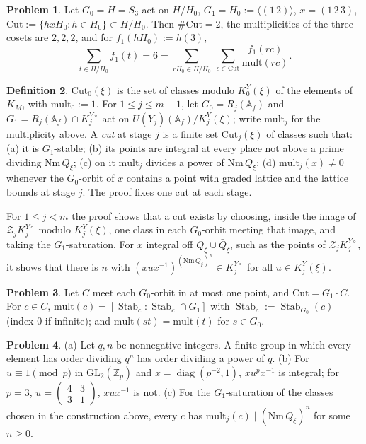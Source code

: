 \documentclass[reqno]{amsart}
\theoremstyle{definition}
\newtheorem{problem}{Problem}[section]
\newtheorem{definition}[problem]{Definition}
\theoremstyle{plain}
\theoremstyle{remark}
\newcommand{\Z}{\mathbb{Z}}
\newcommand{\Af}{\mathbb{A}_f}
\newcommand{\Cut}{\mathrm{Cut}}
\newcommand{\mult}{\mathrm{mult}}
\newcommand{\Nm}{\mathrm{Nm}\,}
\newcommand{\Stab}{\operatorname{Stab}}
\newcommand{\diag}{\operatorname{diag}}
\newcommand{\KYo}[1]{K^{Y\circ}_{#1}}
\newcommand{\KY}[1]{K^{Y}_{#1}(\xi)}
\begin{document}
\begin{problem}\label{pr:toy-cut}
Let \(G_0=H=S_3\) act on \(H/H_0\), \(G_1=H_0:=\langle(1\,2)\rangle\), \(x=(1\,2\,3)\), \(\Cut:=\{h xH_0:h\in H_0\}\subset H/H_0\).  Then \(\#\Cut=2\), the multiplicities of the three cosets are \(2,2,2\), and for \(f_1(hH_0):=h(3)\),
\[
  \sum_{t\in H/H_0}f_1(t)=6=\sum_{rH_0\in H/H_0}\ \sum_{c\in\Cut}\frac{f_1(rc)}{\mult(rc)} .
\]
\end{problem}

\begin{definition}\label{def:cut}
\(\Cut_0(\xi)\) is the set of classes modulo \(\KY0\) of the elements of \(K_M\), with \(\mult_0:=1\).  For \(1\le j\le m-1\), let \(G_0=R_j(\Af)\) and \(G_1=R_j(\Af)\cap\KYo j\) act on \(U(Y_j)(\Af)/\KY j\); write \(\mult_j\) for the multiplicity above.  A \emph{cut} at stage \(j\) is a finite set \(\Cut_j(\xi)\) of classes such that: (a) it is \(G_1\)-stable; (b) its points are integral at every place not above a prime dividing \(\Nm Q_\xi\); (c) on it \(\mult_j\) divides a power of \(\Nm Q_\xi\); (d) \(\mult_j(x)\ne0\) whenever the \(G_0\)-orbit of \(x\) contains a point with graded lattice and the lattice bounds at stage \(j\).  The proof fixes one cut at each stage.
\end{definition}

For \(1\le j<m\) the proof shows that a cut exists by choosing, inside the image of \(\mathcal Z_j\KYo j\) modulo \(\KY j\), one class in each \(G_0\)-orbit meeting that image, and taking the \(G_1\)-saturation.  For \(x\) integral off \(Q_\xi\cup\bar Q_\xi\), such as the points of \(\mathcal Z_j\KYo j\), it shows that there is \(n\) with \((xux^{-1})^{(\Nm Q_\xi)^n}\in\KYo j\) for all \(u\in\KY j\).

\begin{problem}\label{pr:stab}
Let \(C\) meet each \(G_0\)-orbit in at most one point, and \(\Cut=G_1\cdot C\).  For \(c\in C\), \(\mult(c)=[\Stab_c:\Stab_c\cap G_1]\) with \(\Stab_c:=\Stab_{G_0}(c)\) (index \(0\) if infinite); and \(\mult(st)=\mult(t)\) for \(s\in G_0\).
\end{problem}

\begin{problem}\label{pr:mult-dvd}
(a) Let \(q,n\) be nonnegative integers.  A finite group in which every element has order dividing \(q^n\) has order dividing a power of \(q\).  (b) For \(u\equiv1\pmod p\) in \(\mathrm{GL}_2(\Z_p)\) and \(x=\diag(p^{-2},1)\), \(xu^px^{-1}\) is integral; for \(p=3\), \(u=\left(\begin{smallmatrix}4&3\\3&1\end{smallmatrix}\right)\), \(xux^{-1}\) is not.  (c) For the \(G_1\)-saturation of the classes chosen in the construction above, every \(c\) has \(\mult_j(c)\mid(\Nm Q_\xi)^n\) for some \(n\ge0\).
\end{problem}
\end{document}
